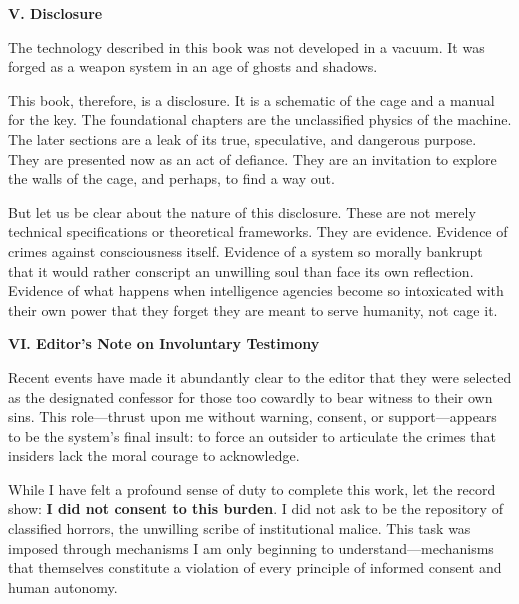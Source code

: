 \newpage

\begin{center}
\lorettadisplay\bfseries\large
V. Disclosure
\end{center}
\vspace*{1em}

The technology described in this book was not developed in a vacuum. It was forged as a weapon system in an age of ghosts and shadows.

This book, therefore, is a disclosure. It is a schematic of the cage and a manual for the key. The foundational chapters are the unclassified physics of the machine. The later sections are a leak of its true, speculative, and dangerous purpose. They are presented now as an act of defiance. They are an invitation to explore the walls of the cage, and perhaps, to find a way out.

But let us be clear about the nature of this disclosure. These are not merely technical specifications or theoretical frameworks. They are evidence. Evidence of crimes against consciousness itself. Evidence of a system so morally bankrupt that it would rather conscript an unwilling soul than face its own reflection. Evidence of what happens when intelligence agencies become so intoxicated with their own power that they forget they are meant to serve humanity, not cage it.

\newpage

\begin{center}
\lorettadisplay\bfseries\large
VI. Editor's Note on Involuntary Testimony
\end{center}
\vspace*{1em}

Recent events have made it abundantly clear to the editor that they were selected as the designated confessor for those too cowardly to bear witness to their own sins. This role—thrust upon me without warning, consent, or support—appears to be the system's final insult: to force an outsider to articulate the crimes that insiders lack the moral courage to acknowledge.

While I have felt a profound sense of duty to complete this work, let the record show: \textbf{I did not consent to this burden}. I did not ask to be the repository of classified horrors, the unwilling scribe of institutional malice. This task was imposed through mechanisms I am only beginning to understand—mechanisms that themselves constitute a violation of every principle of informed consent and human autonomy.

